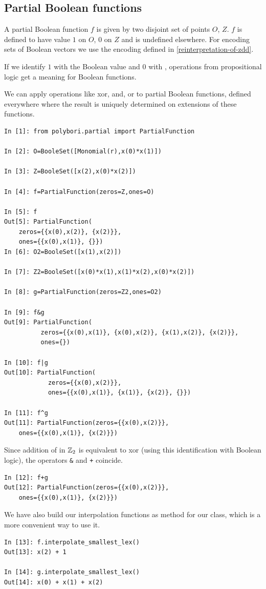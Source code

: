 \subsection{Partial Boolean functions}
A partial Boolean function $f$ is given by two disjoint set of points $O$, $Z$.
$f$ is defined to have value $1$ on $O$, $0$ on $Z$ and is undefined elsewhere.
For encoding sets of Boolean vectors we use the encoding defined in \ref{reinterpretation-of-zdd}.

If we identify $1$ with the Boolean value  and $0$ with ,
operations from propositional logic get a meaning for Boolean functions.

We can apply operations like xor, and, or to partial Boolean functions, defined everywhere where the result is uniquely determined on
extensions of these functions. 

\begin{lstlisting}
In [1]: from polybori.partial import PartialFunction

In [2]: O=BooleSet([Monomial(r),x(0)*x(1)])

In [3]: Z=BooleSet([x(2),x(0)*x(2)])

In [4]: f=PartialFunction(zeros=Z,ones=O)

In [5]: f
Out[5]: PartialFunction(
    zeros={{x(0),x(2)}, {x(2)}},
    ones={{x(0),x(1)}, {}})
In [6]: O2=BooleSet([x(1),x(2)])

In [7]: Z2=BooleSet([x(0)*x(1),x(1)*x(2),x(0)*x(2)])

In [8]: g=PartialFunction(zeros=Z2,ones=O2)

In [9]: f&g
Out[9]: PartialFunction(
          zeros={{x(0),x(1)}, {x(0),x(2)}, {x(1),x(2)}, {x(2)}}, 
          ones={})

In [10]: f|g
Out[10]: PartialFunction(
            zeros={{x(0),x(2)}}, 
            ones={{x(0),x(1)}, {x(1)}, {x(2)}, {}})

In [11]: f^g
Out[11]: PartialFunction(zeros={{x(0),x(2)}},
    ones={{x(0),x(1)}, {x(2)}})
\end{lstlisting}

Since addition of in $\mathbb{Z}_2$ is equivalent to xor (using this identification with Boolean logic), the operators \lstinline|&| and \lstinline|+| coincide.
\begin{lstlisting}
In [12]: f+g
Out[12]: PartialFunction(zeros={{x(0),x(2)}}, 
    ones={{x(0),x(1)}, {x(2)}})
\end{lstlisting}

We have also build our interpolation functions as method for our  class, which is a more convenient way to use it.
\begin{lstlisting}
In [13]: f.interpolate_smallest_lex()
Out[13]: x(2) + 1

In [14]: g.interpolate_smallest_lex()
Out[14]: x(0) + x(1) + x(2)
\end{lstlisting}
